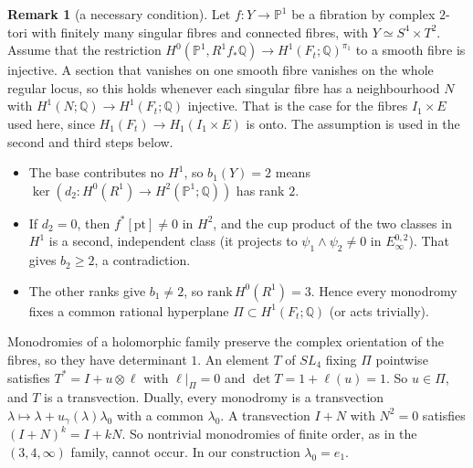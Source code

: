 \documentclass{article}
\theoremstyle{definition}
\newtheorem{remark}[theorem]{Remark}
\theoremstyle{plain}
\newcommand{\Q}{\mathbb{Q}}
\newcommand{\PP}{\mathbb{P}}
\begin{document}
\begin{remark}[a necessary condition]\label{rem:necessity}
Let $f\colon Y\to\PP^1$ be a fibration by complex $2$-tori with finitely many singular
fibres and connected fibres, with $Y\simeq S^4\times T^2$. Assume that the restriction
$H^0(\PP^1,R^1f_*\Q)\to H^1(F_t;\Q)^{\pi_1}$ to a smooth fibre is injective. A section
that vanishes on one smooth fibre vanishes on the whole regular locus, so this holds
whenever each singular fibre has a neighbourhood $N$ with $H^1(N;\Q)\to H^1(F_t;\Q)$
injective. That is the case for the fibres $I_1\times E$ used here, since
$H_1(F_t)\to H_1(I_1\times E)$ is onto. The assumption is used in the second and
third steps below.
\begin{itemize}
\item The base contributes no $H^1$, so $b_1(Y)=2$ means
  $\ker(d_2\colon H^0(R^1)\to H^2(\PP^1;\Q))$ has rank $2$.
\item If $d_2=0$, then $f^*[\mathrm{pt}]\ne0$ in $H^2$, and the cup product of the two
  classes in $H^1$ is a second, independent class (it projects to
  $\psi_1\wedge\psi_2\neq0$ in $E_\infty^{0,2}$). That gives $b_2\ge2$, a contradiction.
\item The other ranks give $b_1\ne2$, so $\mathrm{rank}\,H^0(R^1)=3$. Hence every
  monodromy fixes a common rational hyperplane $\Pi\subset H^1(F_t;\Q)$ (or acts
  trivially).
\end{itemize}
Monodromies of a holomorphic family preserve the complex orientation of the fibres,
so they have determinant $1$. An element $T$ of $SL_4$ fixing $\Pi$ pointwise
satisfies $T^*=I+u\otimes\ell$ with $\ell|_\Pi=0$ and $\det T=1+\ell(u)=1$. So $u\in\Pi$,
and $T$ is a transvection. Dually, every monodromy is a transvection
$\lambda\mapsto\lambda+u_\gamma(\lambda)\lambda_0$ with a common $\lambda_0$. A transvection
$I+N$ with $N^2=0$ satisfies $(I+N)^k=I+kN$. So nontrivial monodromies of finite
order, as in the $(3,4,\infty)$ family, cannot occur. In our construction
$\lambda_0=e_1$.
\end{remark}
\end{document}
